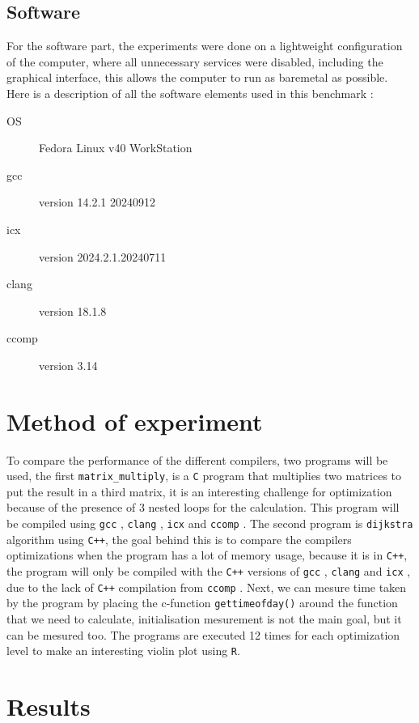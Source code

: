 \documentclass{rapport}
\newcommand{\gcc}{\texttt{gcc} }
\newcommand{\icx}{\texttt{icx} }
\newcommand{\clang}{\texttt{clang} }
\newcommand{\comp}{\texttt{ccomp} }
\begin{document}
\subsection*{Software}
For the software part, the experiments were done on a lightweight configuration of the computer, where all unnecessary services were disabled, 
including the graphical interface, this allows the computer to run as baremetal as possible. \newline
Here is a description of all the software elements used in this benchmark :
\begin{description}
    \item[OS] Fedora Linux v40 WorkStation
    \item[gcc] version 14.2.1 20240912
    \item[icx] version 2024.2.1.20240711
    \item[clang] version 18.1.8
    \item[ccomp] version 3.14
\end{description}

\section{Method of experiment}
To compare the performance of the different compilers, two programs will be used, the first \texttt{matrix\_multiply}, is a \texttt{C} program 
that multiplies two matrices to put the result in a third matrix, it is an interesting challenge for optimization because of the presence of 3 nested loops for 
the calculation. This program will be compiled using \gcc, \clang, \icx and \comp. \newline
The second program is \texttt{dijkstra} algorithm using \texttt{C++}, the goal behind this is to compare the compilers optimizations when the program has a lot
of memory usage, because it is in \texttt{C++}, the program will only be compiled with the \texttt{C++} versions of \gcc, \clang and \icx, due to the lack of \texttt{C++}
compilation from \comp. \newline
Next, we can mesure time taken by the program by placing the c-function \texttt{gettimeofday()} around the function that we need to calculate, initialisation 
mesurement is not the main goal, but it can be mesured too. The programs are executed 12 times for each optimization level to make an interesting violin plot using \texttt{R}.

\section{Results}
\end{document}

